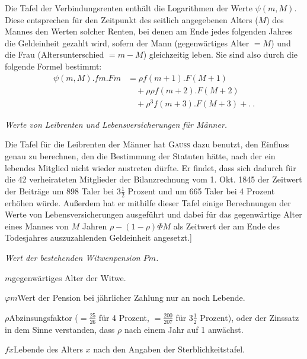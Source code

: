 Die Tafel der Verbindungsrenten enthält die Logarithmen der Werte \(\psi(m,M)\). Diese entsprechen für den Zeitpunkt des seitlich angegebenen Alters (\(M\)) des Mannes den Werten solcher Renten, bei denen am Ende jedes folgenden Jahres die Geldeinheit gezahlt wird, sofern der Mann (gegenwärtiges Alter \(=M\)) und die Frau (Altersunterschied \(=m-M\)) gleichzeitig leben. Sie sind also durch die folgende Formel bestimmt:
\[
\begin{aligned}
\psi(m,M)\mathord{.}fm\mathord{.}Fm&=\rho f(m+1)\mathord{.}F(M+1)\\
&\quad+\rho\rho f(m+2)\mathord{.}F(M+2)\\
&\quad+\rho^3f(m+3)\mathord{.}F(M+3)+.\ .
\end{aligned}
\]
\begin{center}\textit{Werte von Leibrenten und Lebensversicherungen für Männer.}\end{center}
\noindent\hspace*{1.2em} Die Tafel für die Leibrenten der Männer hat \textsc{Gauss} dazu benutzt, den Einfluss genau zu berechnen, den die Bestimmung der Statuten hätte, nach der ein lebendes Mitglied nicht wieder austreten dürfte. Er findet, dass sich dadurch für die 42 verheirateten Mitglieder der Bilanzrechnung vom 1. Okt. 1845 der Zeitwert der Beiträge um 898 Taler bei \(3\tfrac{1}{2}\) Prozent und um 665 Taler bei 4 Prozent erhöhen würde. Außerdem hat er mithilfe dieser Tafel einige Berechnungen der Werte von Lebensversicherungen ausgeführt und dabei für das gegenwärtige Alter eines Mannes von \(M\) Jahren \(\rho-(1-\rho)\Phi M\) als Zeitwert der am Ende des Todesjahres auszuzahlenden Geldeinheit angesetzt.]

\begin{center}\textit{Wert der bestehenden Witwenpension \(Pm\).}\end{center}
\noindent \(m\)\quad gegenwärtiges Alter der Witwe.\par
\noindent \(\varphi m\)\quad Wert der Pension bei jährlicher Zahlung nur an noch Lebende.\par
\noindent \(\rho\)\quad Abzinsungsfaktor (\(=\tfrac{25}{26}\) für 4 Prozent, \(=\tfrac{200}{207}\) für \(3\tfrac{1}{2}\) Prozent), oder der Zinssatz in dem Sinne verstanden, dass \(\rho\) nach einem Jahr auf 1 anwächst.\par
\noindent \(fx\)\quad Lebende des Alters \(x\) nach den Angaben der Sterblichkeitstafel.

